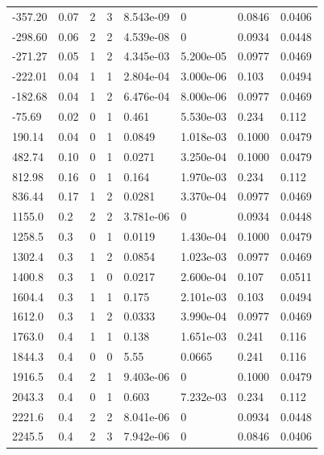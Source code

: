 \documentclass[preview]{standalone}
\begin{document}
{{\begin{tabular}{L{1.2cm}C{1.2cm} C{0.3cm}C{0.5cm} C{1.4cm}C{1.4cm} C{1.4cm}C{1.4cm}}
  -357.20  &  0.07  & 2     &  3 &  8.543e-09  & 0  & 0.0846 &  0.0406   \\ 
  -298.60  &  0.06  & 2     &  2 &  4.539e-08  & 0  & 0.0934 &  0.0448   \\ 
  -271.27  &  0.05  & 1     &  2 &  4.345e-03  & 5.200e-05  & 0.0977 &  0.0469   \\ 
  -222.01  &  0.04  & 1     &  1 &  2.804e-04  & 3.000e-06  & 0.103 &  0.0494   \\ 
  -182.68  &  0.04  & 1     &  2 &  6.476e-04  & 8.000e-06  & 0.0977 &  0.0469   \\ 
  -75.69  &  0.02  & 0     &  1 &  0.461  & 5.530e-03  & 0.234 &  0.112   \\ 
  190.14  &  0.04  & 0     &  1 &  0.0849  & 1.018e-03  & 0.1000 &  0.0479   \\ 
  482.74  &  0.10  & 0     &  1 &  0.0271  & 3.250e-04  & 0.1000 &  0.0479   \\ 
  812.98  &  0.16  & 0     &  1 &  0.164  & 1.970e-03  & 0.234 &  0.112   \\ 
  836.44  &  0.17  & 1     &  2 &  0.0281  & 3.370e-04  & 0.0977 &  0.0469   \\ 
  1155.0  &   0.2  & 2     &  2 &  3.781e-06  & 0  & 0.0934 &  0.0448   \\ 
  1258.5  &   0.3  & 0     &  1 &  0.0119  & 1.430e-04  & 0.1000 &  0.0479   \\ 
  1302.4  &   0.3  & 1     &  2 &  0.0854  & 1.023e-03  & 0.0977 &  0.0469   \\ 
  1400.8  &   0.3  & 1     &  0 &  0.0217  & 2.600e-04  & 0.107 &  0.0511   \\ 
  1604.4  &   0.3  & 1     &  1 &  0.175  & 2.101e-03  & 0.103 &  0.0494   \\ 
  1612.0  &   0.3  & 1     &  2 &  0.0333  & 3.990e-04  & 0.0977 &  0.0469   \\ 
  1763.0  &   0.4  & 1     &  1 &  0.138  & 1.651e-03  & 0.241 &  0.116   \\ 
  1844.3  &   0.4  & 0     &  0 &  5.55  & 0.0665  & 0.241 &  0.116   \\ 
  1916.5  &   0.4  & 2     &  1 &  9.403e-06  & 0  & 0.1000 &  0.0479   \\ 
  2043.3  &   0.4  & 0     &  1 &  0.603  & 7.232e-03  & 0.234 &  0.112   \\ 
  2221.6  &   0.4  & 2     &  2 &  8.041e-06  & 0  & 0.0934 &  0.0448   \\ 
  2245.5  &   0.4  & 2     &  3 &  7.942e-06  & 0  & 0.0846 &  0.0406   \\ 

\end{tabular}}}
\end{document}
